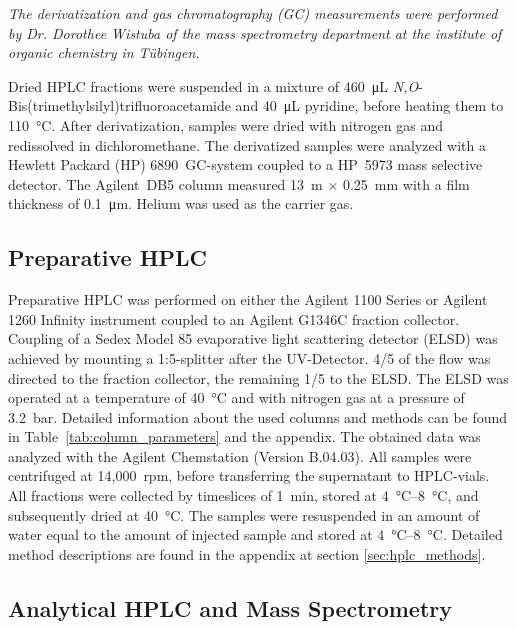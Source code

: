 	\emph{The derivatization and gas chromatography (GC) measurements were performed by Dr. Dorothee Wistuba of the mass spectrometry department at the institute of organic chemistry in Tübingen.}
	
	Dried HPLC fractions were suspended in a mixture of \SI{460}{\micro\liter} \emph{N,O}-Bis(trimethylsilyl)\-trifluoro\-acetamide and \SI{40}{\micro\liter} pyridine, before heating them to \SI{110}{\celsius}. After derivatization, samples were dried with nitrogen gas and redissolved in dichloromethane.
	The derivatized samples were analyzed with a Hewlett Packard (HP) 6890~GC-system coupled to a HP~5973 mass selective detector. The Agilent~DB5 column measured 13~m $\times$ 0.25~mm with a film thickness of \SI{0.1}{\micro\meter}. Helium was used as the carrier gas.

	\subsection{Preparative HPLC} %
	\label{sub:preparative_hplc}

	Preparative HPLC was performed on either the Agilent 1100 Series or Agilent 1260 Infinity instrument coupled to an Agilent G1346C fraction collector. Coupling of a Sedex Model 85 evaporative light scattering detector (ELSD) was achieved by mounting a 1:5-splitter after the UV-Detector. 4/5 of the flow was directed to the fraction collector, the remaining 1/5 to the ELSD. The ELSD was operated at a temperature of \SI{40}{\celsius} and with nitrogen gas at a pressure of \SI{3.2}{\bar}. Detailed information about the used columns and methods can be found in Table~\ref{tab:column_parameters} and the appendix. The obtained data was analyzed with the Agilent Chemstation (Version B.04.03).
	All samples were centrifuged at 14,000~rpm, before transferring the supernatant to HPLC-vials. All fractions were collected by timeslices of \SI{1}{\minute}, stored at \SIrange{4}{8}{\celsius}, and subsequently dried at \SI{40}{\celsius}. The samples were resuspended in an amount of water equal to the amount of injected sample and stored at \SIrange{4}{8}{\celsius}. Detailed method descriptions are found in the appendix at section \ref{sec:hplc_methods}.


	\subsection{Analytical HPLC and Mass Spectrometry} %
	\label{sub:analytical_hplc_and_mass_spectrometry}


